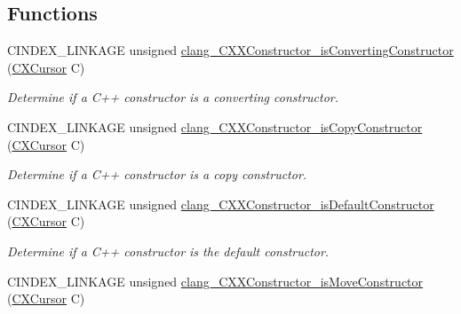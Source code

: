 \subsection*{Functions}
\begin{DoxyCompactItemize}
\item 
\mbox{\label{group__CINDEX__CPP_ga64f60658013fe2cc9f568fe5a5f55d4f}} 
C\+I\+N\+D\+E\+X\+\_\+\+L\+I\+N\+K\+A\+GE unsigned \mbox{\hyperlink{group__CINDEX__CPP_ga64f60658013fe2cc9f568fe5a5f55d4f}{clang\+\_\+\+C\+X\+X\+Constructor\+\_\+is\+Converting\+Constructor}} (\mbox{\hyperlink{structCXCursor}{C\+X\+Cursor}} C)
\begin{DoxyCompactList}\small\item\em Determine if a C++ constructor is a converting constructor. \end{DoxyCompactList}\item 
\mbox{\label{group__CINDEX__CPP_ga0c6580828662fd27cb7152e47c1b3e4e}} 
C\+I\+N\+D\+E\+X\+\_\+\+L\+I\+N\+K\+A\+GE unsigned \mbox{\hyperlink{group__CINDEX__CPP_ga0c6580828662fd27cb7152e47c1b3e4e}{clang\+\_\+\+C\+X\+X\+Constructor\+\_\+is\+Copy\+Constructor}} (\mbox{\hyperlink{structCXCursor}{C\+X\+Cursor}} C)
\begin{DoxyCompactList}\small\item\em Determine if a C++ constructor is a copy constructor. \end{DoxyCompactList}\item 
\mbox{\label{group__CINDEX__CPP_ga4c15c2e3e4dd6258cbf26547dd76229b}} 
C\+I\+N\+D\+E\+X\+\_\+\+L\+I\+N\+K\+A\+GE unsigned \mbox{\hyperlink{group__CINDEX__CPP_ga4c15c2e3e4dd6258cbf26547dd76229b}{clang\+\_\+\+C\+X\+X\+Constructor\+\_\+is\+Default\+Constructor}} (\mbox{\hyperlink{structCXCursor}{C\+X\+Cursor}} C)
\begin{DoxyCompactList}\small\item\em Determine if a C++ constructor is the default constructor. \end{DoxyCompactList}\item 
\mbox{\label{group__CINDEX__CPP_gaa1cb77ef71cca950b8ec7d1e6666a8a2}} 
C\+I\+N\+D\+E\+X\+\_\+\+L\+I\+N\+K\+A\+GE unsigned \mbox{\hyperlink{group__CINDEX__CPP_gaa1cb77ef71cca950b8ec7d1e6666a8a2}{clang\+\_\+\+C\+X\+X\+Constructor\+\_\+is\+Move\+Constructor}} (\mbox{\hyperlink{structCXCursor}{C\+X\+Cursor}} C)

\end{DoxyCompactItemize}
